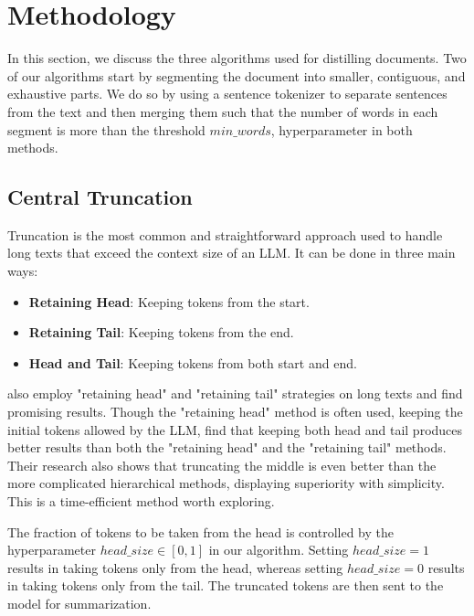 \section{Methodology}
	\label{sec:methodology}

	In this section, we discuss the three algorithms used for distilling documents.
	Two of our algorithms start by segmenting the document into smaller, contiguous, and exhaustive
	parts.
	We do so by using a sentence tokenizer to separate sentences from the text and then merging
	them such that the number of words in each segment is more than the threshold $min\_words$,
	hyperparameter in both methods.


	\subsection{Central Truncation}
		\label{method:truncation}

		Truncation is the most common and straightforward approach used to handle long texts that exceed
		the context size of an LLM.
		It can be done in three main ways:

		\begin{itemize}
			\item \textbf{Retaining Head}: Keeping tokens from the start.
			\item \textbf{Retaining Tail}: Keeping tokens from the end.
			\item \textbf{Head and Tail}: Keeping tokens from both start and end.
		\end{itemize}

		\citet{worsham-kalita-2018-genre} also employ "retaining head" and "retaining tail" strategies
		on long texts and find promising results.
		Though the "retaining head" method is often used, keeping the initial tokens allowed by the LLM,
		\citet{sun2019fine} find that keeping both head and tail produces better results than both the
		"retaining head" and the "retaining tail" methods.
		Their research also shows that truncating the middle is even better than the more complicated
		hierarchical methods, displaying superiority with simplicity.
		This is a time-efficient method worth exploring.

		The fraction of tokens to be taken from the head is controlled by the hyperparameter $head\_size
		\in [0, 1]$ in our algorithm.
		Setting $head\_size = 1$ results in taking tokens only from the head, whereas setting $head\_size
		= 0$ results in taking tokens only from the tail.
		The truncated tokens are then sent to the model for summarization.


